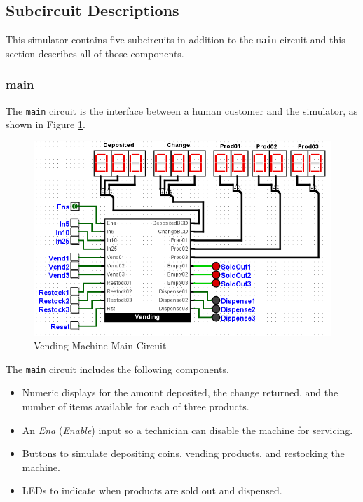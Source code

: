 \subsection{Subcircuit Descriptions}

This simulator contains five subcircuits in addition to the \lstinline[columns=fixed]|main| circuit and this section describes all of those components.

\subsubsection{main}

The \lstinline[columns=fixed]|main| circuit is the interface between a human customer and the simulator, as shown in Figure \ref{fig:05-01}. 

\begin{figure}[H]
	\centering
	\includegraphics[width=\maxwidth{.95\linewidth}]{gfx/05-01}
	\caption{Vending Machine Main Circuit}
	\label{fig:05-01}
\end{figure}

The \lstinline[columns=fixed]|main| circuit includes the following components.

\begin{itemize}
	\item Numeric displays for the amount deposited, the change returned, and the number of items available for each of three products.
	\item An \textit{Ena} (\textit{Enable}) input so a technician can disable the machine for servicing.
	\item Buttons to simulate depositing coins, vending products, and restocking the machine.
	\item LEDs to indicate when products are sold out and dispensed.
\end{itemize}

